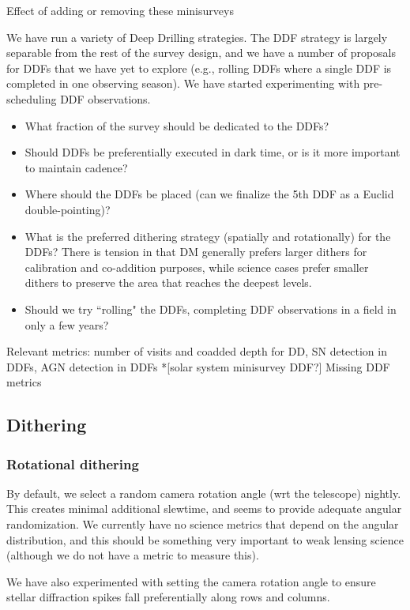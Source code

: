 Effect of adding or removing these minisurveys

We have run a variety of Deep Drilling strategies. The DDF strategy is largely separable from the rest of the survey design, and we have a number of proposals for DDFs that we have yet to explore (e.g., rolling DDFs where a single DDF is completed in one observing season).  We have started experimenting with pre-scheduling DDF observations. 

\begin{itemize}
    \item{What fraction of the survey should be dedicated to the DDFs?}
    \item{Should DDFs be preferentially executed in dark time, or is it more important to maintain cadence?}
    \item{Where should the DDFs be placed (can we finalize the 5th DDF as a Euclid double-pointing)?}
    \item{What is the preferred dithering strategy (spatially and rotationally) for the DDFs? There is tension in that DM generally prefers larger dithers for calibration and co-addition purposes, while science cases prefer smaller dithers to preserve the area that reaches the deepest levels.}
    \item{Should we try ``rolling" the DDFs, completing DDF observations in a field in only a few years?}
\end{itemize}

Relevant metrics: number of visits and coadded depth for DD, SN detection in DDFs, AGN detection in DDFs
*[solar system minisurvey DDF?]
Missing DDF metrics

\subsection{Dithering}

\subsubsection{Rotational dithering}

By default, we select a random camera rotation angle (wrt the telescope) nightly. This creates minimal additional slewtime, and seems to provide adequate angular randomization.  We currently have no science metrics that depend on the angular distribution, and this should be something very important to weak lensing science (although we do not have a metric to measure this).

We have also experimented with setting the camera rotation angle to ensure stellar diffraction spikes fall preferentially along rows and columns. 


